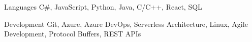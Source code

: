 
\begin{cvskills}
	\cvskill
		{Languages}
		{C\#, JavaScript, Python, Java, C/C++, React, SQL}

	\cvskill
		{Development}
		{Git, Azure, Azure DevOps, Serverless Architecture, Linux, Agile Development, Protocol Buffers, REST APIs}
\end{cvskills}